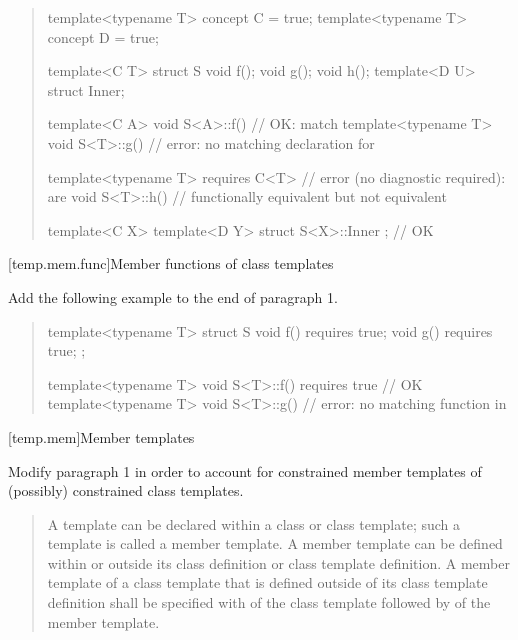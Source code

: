 \begin{quote}
\begin{addedblock}
\enterexample
\begin{codeblock}
template<typename T> concept C = true;
template<typename T> concept D = true;

template<C T> struct S {
    void f();
    void g();
    void h();
    template<D U> struct Inner;
  }

template<C A> void S<A>::f() { }        // OK:  match
template<typename T> void S<T>::g() { } // error: no matching declaration for 

template<typename T> requires C<T>      // error (no diagnostic required):  are
void S<T>::h() { }                      // functionally equivalent but not equivalent

template<C X> template<D Y> struct S<X>::Inner { }; // OK
\end{codeblock}
\exitexample
\end{addedblock}
\end{quote}


[temp.mem.func]{Member functions of class templates}

Add the following example to the end of paragraph 1.

\begin{quote}
\begin{addedblock}
\enterexample
\begin{codeblock}
template<typename T> struct S {
  void f() requires true;
  void g() requires true;
};

template<typename T> 
  void S<T>::f() requires true { } // OK
template<typename T> 
  void S<T>::g() { }               // error: no matching function in 
\end{codeblock}
\exitexample
\end{addedblock}
\end{quote}


[temp.mem]{Member templates}


Modify paragraph 1 in order to account for constrained member templates
of (possibly) constrained class templates. 

\begin{quote}
\pnum
A template can be declared within a class or class template; such a 
template is called a member template. 
% 
A member template can be defined within or outside its class definition 
or class template definition. 
% 
A member template of a class template that is defined outside of its 
class template definition shall be specified with
of the class template followed by
of the member template.
\end{quote}


